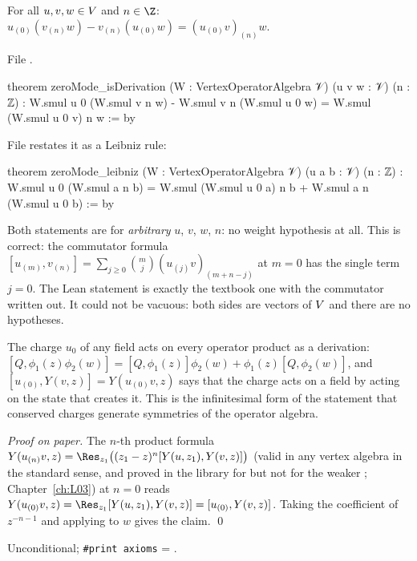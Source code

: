 \begin{theorem}\label{l04:thm:deriv}
For all $u,v,w\in V$ and $n\in\Z$:
$u_{(0)}(v_{(n)}w) - v_{(n)}(u_{(0)}w) = (u_{(0)}v)_{(n)}w$.
\end{theorem}
\noindent File .
\begin{leancode}
theorem zeroMode_isDerivation (W : VertexOperatorAlgebra 𝒱) (u v w : 𝒱) (n : ℤ) :
    W.smul u 0 (W.smul v n w) - W.smul v n (W.smul u 0 w) = W.smul (W.smul u 0 v) n w := by
\end{leancode}
File  restates it as a Leibniz rule:
\begin{leancode}
theorem zeroMode_leibniz (W : VertexOperatorAlgebra 𝒱) (u a b : 𝒱) (n : ℤ) :
    W.smul u 0 (W.smul a n b) = W.smul (W.smul u 0 a) n b + W.smul a n (W.smul u 0 b) := by
\end{leancode}
\begin{dictionary}
Both statements are for \emph{arbitrary} $u$, $v$, $w$, $n$: no weight hypothesis at all. This is
correct: the commutator formula $[u_{(m)},v_{(n)}] = \sum_{j\ge0}\binom mj(u_{(j)}v)_{(m+n-j)}$
at $m = 0$ has the single term $j = 0$. The Lean statement is exactly the textbook one with the
commutator written out. It could not be vacuous: both sides are vectors of $V$ and there are
no hypotheses.
\end{dictionary}
\begin{physics}
The charge $u_0$ of any field acts on every operator product as a derivation: $[Q,\phi_1(z)\phi_2(w)]
= [Q,\phi_1(z)]\phi_2(w) + \phi_1(z)[Q,\phi_2(w)]$, and $[u_{(0)},Y(v,z)] = Y(u_{(0)}v,z)$ says that
the charge acts on a field by acting on the state that creates it. This is the infinitesimal form of
the statement that conserved charges generate symmetries of the operator algebra.
\end{physics}
\emph{Proof on paper.} The $n$-th product formula $Y(u_{(n)}v,z) = \Res_{z_1}
\big((z_1-z)^n[Y(u,z_1),Y(v,z)]\big)$ (valid in any vertex algebra in the standard sense, and proved in the library for
 but not for the weaker ; Chapter~\ref{ch:L03}) at
$n = 0$ reads $Y(u_{(0)}v,z) = \Res_{z_1}[Y(u,z_1),Y(v,z)] = [u_{(0)},Y(v,z)]$. Taking the coefficient
of $z^{-n-1}$ and applying to $w$ gives the claim. \qed
\begin{status}
Unconditional; \texttt{\#print axioms} = .
\end{status}


